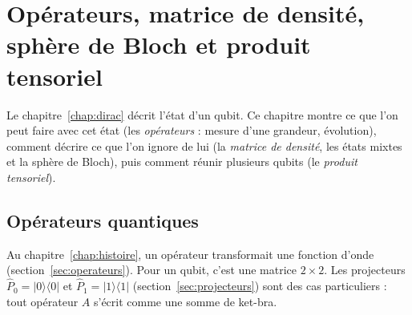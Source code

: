 
\providecommand{\ket}[1]{|#1\rangle}
\providecommand{\bra}[1]{\langle #1|}
\providecommand{\braket}[2]{\langle #1|#2\rangle}

\section{Opérateurs, matrice de densité, sphère de Bloch et produit tensoriel}\label{chap:operateurs}

Le chapitre~\ref{chap:dirac} décrit l'état d'un qubit. Ce chapitre montre ce que l'on peut faire
avec cet état (les \emph{opérateurs} : mesure d'une grandeur, évolution), comment décrire ce que
l'on ignore de lui (la \emph{matrice de densité}, les états mixtes et la sphère de Bloch), puis
comment réunir plusieurs qubits (le \emph{produit tensoriel}).

\subsection{Opérateurs quantiques}\label{sec:op-dirac}

Au chapitre~\ref{chap:histoire}, un opérateur transformait une fonction d'onde
(section~\ref{sec:operateurs}). Pour un qubit, c'est une matrice $2\times2$. Les projecteurs
$\hat P_0=\ket{0}\bra{0}$ et $\hat P_1=\ket{1}\bra{1}$ (section~\ref{sec:projecteurs}) sont des
cas particuliers : tout opérateur $A$ s'écrit comme une somme de ket-bra.

